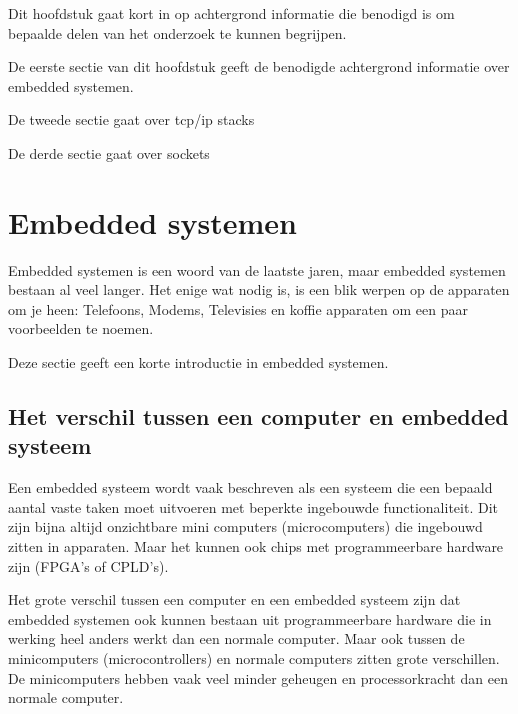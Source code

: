 \documentclass[../DCM2_Verslag.tex]{subfiles}
\begin{document}
Dit hoofdstuk gaat kort in op achtergrond informatie die benodigd is om bepaalde delen van het onderzoek te kunnen begrijpen.

De eerste sectie van dit hoofdstuk geeft de benodigde achtergrond informatie over embedded systemen.

De tweede sectie gaat over tcp/ip stacks

De derde sectie gaat over sockets

\section{Embedded systemen}
Embedded systemen is een woord van de laatste jaren, maar embedded systemen bestaan al veel langer. Het enige wat nodig is, is een blik werpen op de apparaten om je heen: Telefoons, Modems, Televisies en koffie apparaten om een paar voorbeelden te noemen. 

Deze sectie geeft een korte introductie in embedded systemen.

\subsection{Het verschil tussen een computer en embedded systeem}
Een embedded systeem wordt vaak beschreven als een systeem die een bepaald aantal vaste taken moet uitvoeren met beperkte ingebouwde functionaliteit. Dit zijn bijna altijd onzichtbare mini computers (microcomputers) die ingebouwd zitten in apparaten. Maar het kunnen ook chips met programmeerbare hardware zijn (FPGA's of CPLD's). 

Het grote verschil tussen een computer en een embedded systeem zijn dat embedded systemen ook kunnen bestaan uit programmeerbare hardware die in werking heel anders werkt dan een normale computer. Maar ook tussen de minicomputers (microcontrollers) en normale computers zitten grote verschillen. De minicomputers hebben vaak veel minder geheugen en processorkracht dan een normale computer. 
\end{document}
